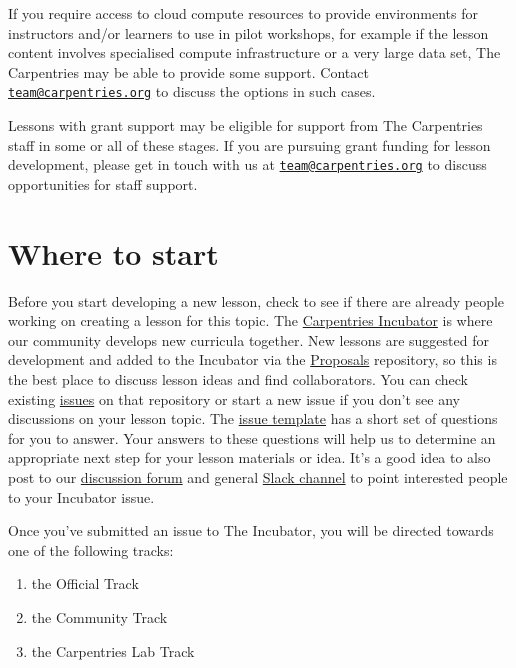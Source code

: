 \documentclass[
]{book}
\providecommand{\tightlist}{%
  \setlength{\itemsep}{0pt}\setlength{\parskip}{0pt}}
\begin{document}
If you require access to cloud compute resources to provide
environments for instructors and/or learners to use in pilot workshops,
for example if the lesson content involves specialised compute infrastructure
or a very large data set,
The Carpentries may be able to provide some support.
Contact \href{mailto:team@carpentries.org}{\nolinkurl{team@carpentries.org}} to discuss the options in such cases.

Lessons with grant support may be eligible for
support from The Carpentries staff in some or all of
these stages. If you are pursuing grant funding for
lesson development, please get in touch with us at
\href{mailto:team@carpentries.org}{\nolinkurl{team@carpentries.org}} to discuss opportunities for staff
support.

\hypertarget{where-to-start}{%
\section{Where to start}\label{where-to-start}}

Before you start developing a new lesson, check
to see if there are already people working on creating
a lesson for this topic.
The \href{https://github.com/carpentries-incubator/}{Carpentries Incubator} is where our community
develops new curricula together.
New lessons are suggested for development and added to the Incubator via the \href{https://github.com/carpentries-incubator/proposals/}{Proposals} repository,
so this is the best place to discuss lesson ideas and find collaborators.
You can check existing \href{https://github.com/carpentries-incubator/proposals/issues}{issues} on that repository
or start a new issue if you don't see any discussions
on your lesson topic. The \href{https://github.com/carpentries-incubator/proposals/blob/master/ISSUE_TEMPLATE.md}{issue template} has
a short set of questions for you to answer. Your answers
to these questions will help us to determine an
appropriate next step for your lesson materials or
idea. It's a good idea to also post to our
\href{https://carpentries.topicbox.com/groups/discuss}{discussion forum} and general \href{https://swc-slack-invite.herokuapp.com/}{Slack channel} to point interested people to your
Incubator issue.

Once you've submitted an issue to The Incubator,
you will be directed towards one of the following
tracks:

\begin{enumerate}
\def\labelenumi{\arabic{enumi}.}
\tightlist
\item
  the Official Track
\item
  the Community Track
\item
  the Carpentries Lab Track
\end{enumerate}
\end{document}
